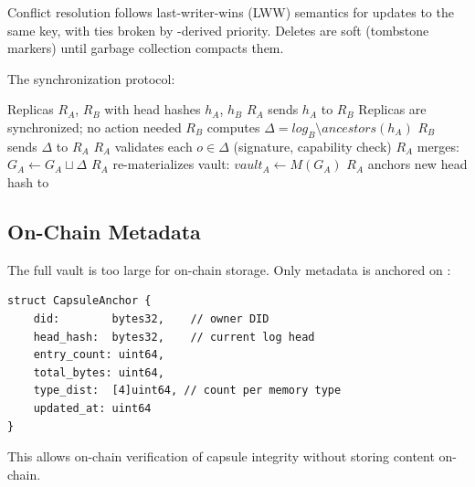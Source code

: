 Conflict resolution follows last-writer-wins (LWW) semantics for updates to the same key, with ties broken by \DID{}-derived priority. Deletes are soft (tombstone markers) until garbage collection compacts them.

The synchronization protocol:

\begin{algorithm}
\caption{CRDT Sync Between Capsule Replicas}
\begin{algorithmic}[1]
\REQUIRE Replicas $R_A$, $R_B$ with head hashes $h_A$, $h_B$
\STATE $R_A$ sends $h_A$ to $R_B$
    \STATE Replicas are synchronized; no action needed
\ELSE
    \STATE $R_B$ computes $\Delta = \textit{log}_B \setminus \textit{ancestors}(h_A)$
    \STATE $R_B$ sends $\Delta$ to $R_A$
    \STATE $R_A$ validates each $o \in \Delta$ (signature, capability check)
    \STATE $R_A$ merges: $G_A \leftarrow G_A \sqcup \Delta$
    \STATE $R_A$ re-materializes vault: $\textit{vault}_A \leftarrow M(G_A)$
    \STATE $R_A$ anchors new head hash to \IChain{}
\ENDIF
\end{algorithmic}
\end{algorithm}

\subsection{On-Chain Metadata}

The full vault is too large for on-chain storage. Only metadata is anchored on \IChain{}:

\begin{verbatim}
struct CapsuleAnchor {
    did:        bytes32,    // owner DID
    head_hash:  bytes32,    // current log head
    entry_count: uint64,
    total_bytes: uint64,
    type_dist:  [4]uint64, // count per memory type
    updated_at: uint64
}
\end{verbatim}

This allows on-chain verification of capsule integrity without storing content on-chain.

